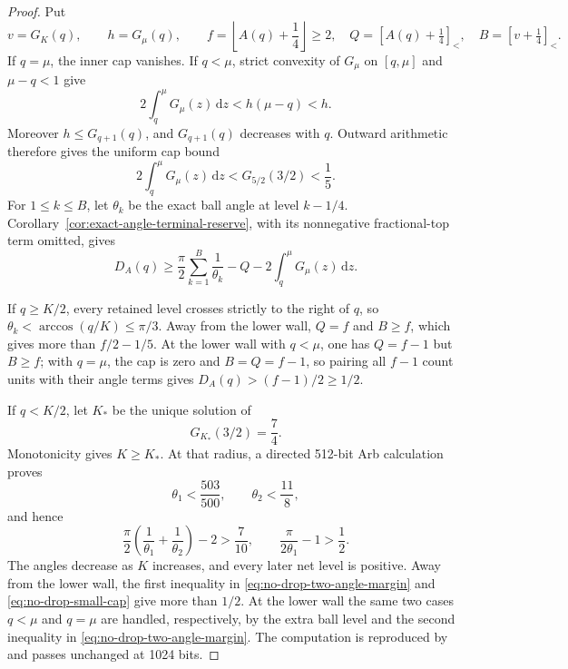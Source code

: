 \documentclass[11pt]{article}
\theoremstyle{remark}
\newcommand{\sbr}[1]{[#1]_{<}}
\newcommand{\dd}{\,\mathrm d}
\begin{document}
\begin{proof}
Put
\[
 v=G_K(q),\qquad h=G_\mu(q),\qquad
 f=\left\lfloor A(q)+\frac14\right\rfloor\geq2,
 \quad Q=\sbr{A(q)+\tfrac14},\quad B=\sbr{v+\tfrac14}.
\]
If $q=\mu$, the inner cap vanishes.  If $q<\mu$, strict convexity of
$G_\mu$ on $[q,\mu]$ and $\mu-q<1$ give
\[
 2\int_q^\mu G_\mu(z)\dd z<h(\mu-q)<h.
\]
Moreover $h\leq G_{q+1}(q)$, and $G_{q+1}(q)$ decreases with $q$.  Outward
arithmetic therefore gives the uniform cap bound
\begin{equation}
 2\int_q^\mu G_\mu(z)\dd z
 <G_{5/2}(3/2)<\frac15.
 \label{eq:no-drop-small-cap}
\end{equation}
For $1\leq k\leq B$, let $\theta_k$ be the exact ball angle at level
$k-1/4$.  Corollary~\ref{cor:exact-angle-terminal-reserve}, with its
nonnegative fractional-top term omitted, gives
\begin{equation}
 D_A(q)\geq\frac\pi2\sum_{k=1}^{B}\frac1{\theta_k}
 -Q-2\int_q^\mu G_\mu(z)\dd z.
 \label{eq:no-drop-half-unit-angle}
\end{equation}

If $q\geq K/2$, every retained level crosses strictly to the right of
$q$, so $\theta_k<\arccos(q/K)\leq\pi/3$.  Away from the lower wall,
$Q=f$ and $B\geq f$, which gives more than $f/2-1/5$.  At the lower wall
with $q<\mu$, one has $Q=f-1$ but $B\geq f$; with $q=\mu$, the cap is zero
and $B=Q=f-1$, so pairing all $f-1$ count units with their angle terms
gives $D_A(q)>(f-1)/2\geq1/2$.

If $q<K/2$, let $K_*$ be the unique solution of
\[
 G_{K_*}(3/2)=\frac74.
\]
Monotonicity gives $K\geq K_*$.  At that radius, a directed 512-bit Arb
calculation proves
\[
 \theta_1<\frac{503}{500},\qquad
 \theta_2<\frac{11}{8},
\]
and hence
\begin{equation}
 \frac\pi2\left(\frac1{\theta_1}+\frac1{\theta_2}\right)-2
 >\frac7{10},\qquad
 \frac\pi{2\theta_1}-1>\frac12.
 \label{eq:no-drop-two-angle-margin}
\end{equation}
The angles decrease as $K$ increases, and every later net level is
positive.  Away from the lower wall, the first inequality in
\eqref{eq:no-drop-two-angle-margin} and
\eqref{eq:no-drop-small-cap} give more than $1/2$.  At the lower wall the
same two cases $q<\mu$ and $q=\mu$ are handled, respectively, by the extra
ball level and the second inequality in
\eqref{eq:no-drop-two-angle-margin}.  The computation is reproduced by
 and passes unchanged at
1024 bits.
\end{proof}
\end{document}
